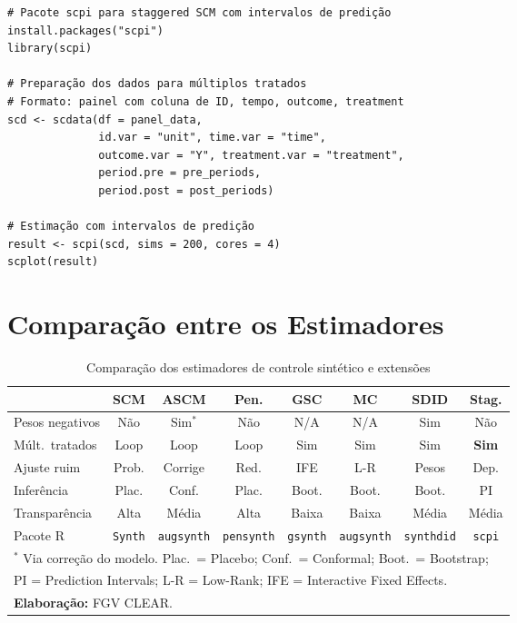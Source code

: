 \documentclass[12pt, a4paper, openany]{book}
\begin{document}
\begin{lstlisting}[style=Rstyle]
# Pacote scpi para staggered SCM com intervalos de predição
install.packages("scpi")
library(scpi)

# Preparação dos dados para múltiplos tratados
# Formato: painel com coluna de ID, tempo, outcome, treatment
scd <- scdata(df = panel_data,
              id.var = "unit", time.var = "time",
              outcome.var = "Y", treatment.var = "treatment",
              period.pre = pre_periods,
              period.post = post_periods)

# Estimação com intervalos de predição
result <- scpi(scd, sims = 200, cores = 4)
scplot(result)
\end{lstlisting}


\section{Comparação entre os Estimadores}

\begin{table}[H]
\centering
\caption{Comparação dos estimadores de controle sintético e extensões}
\label{tab:comparacao_ext}
\footnotesize
\begin{tabular}{lccccccc}
\toprule
 & \textbf{SCM} & \textbf{ASCM} & \textbf{Pen.} & \textbf{GSC} & \textbf{MC} & \textbf{SDID} & \textbf{Stag.} \\
\midrule
Pesos negativos      & Não  & Sim$^*$   & Não  & N/A  & N/A  & Sim   & Não \\
Múlt.\ tratados      & Loop & Loop      & Loop & Sim  & Sim  & Sim   & \textbf{Sim} \\
Ajuste ruim          & Prob.& Corrige   & Red. & IFE  & L-R  & Pesos & Dep. \\
Inferência           & Plac.& Conf.     & Plac.& Boot.& Boot.& Boot. & PI \\
Transparência        & Alta & Média     & Alta & Baixa& Baixa& Média & Média \\
Pacote R             & \tiny\texttt{Synth} & \tiny\texttt{augsynth} & \tiny\texttt{pensynth} & \tiny\texttt{gsynth} & \tiny\texttt{augsynth} & \tiny\texttt{synthdid} & \tiny\texttt{scpi} \\
\bottomrule
\multicolumn{8}{l}{\footnotesize $^*$ Via correção do modelo. Plac.\ = Placebo; Conf.\ = Conformal; Boot.\ = Bootstrap;} \\
\multicolumn{8}{l}{\footnotesize PI = Prediction Intervals; L-R = Low-Rank; IFE = Interactive Fixed Effects.} \\
\multicolumn{8}{l}{\footnotesize \textbf{Elaboração:} FGV CLEAR.}
\end{tabular}
\end{table}
\end{document}
